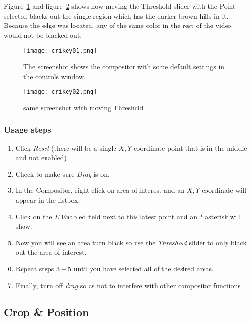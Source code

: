 Figure~\ref{fig:crikey01} and figure~\ref{fig:crikey02} shows how moving the Threshold slider with the Point selected blacks out the single region which has the darker brown hills in it. Because the edge was located, any of the same color in the rest of the video would not be blacked out.

\begin{figure}[htpb]
    \centering
    \texttt{[image: crikey01.png]}
    \caption{The screenshot shows the compositor with some default settings in the controls window.}
    \label{fig:crikey01}
\end{figure}

\begin{figure}[htpb]
    \centering
    \texttt{[image: crikey02.png]}
    \caption{same screenshot with moving Threshold}
    \label{fig:crikey02}
\end{figure}

\subsubsection*{Usage steps}
\label{ssub:usage_steps}

\begin{enumerate}
    \item Click \textit{Reset} (there will be a single $X,Y$ coordinate point that is in the middle and not enabled)
    \item Check to make sure \textit{Drag} is on.
    \item In the Compositor, right click on area of interest and an $X,Y$ coordinate will appear in the listbox.
    \item Click on the \textit{E} Enabled field next to this latest point and an $*$ asterisk will show.
    \item Now you will see an area turn black so use the \textit{Threshold} slider to only black out the area of interest.
    \item Repeat steps $3-5$ until you have selected all of the desired areas.
    \item Finally, turn off \textit{drag} so as not to interfere with other compositor functions
\end{enumerate}

\subsection{Crop \& Position}%
\label{sub:crop_position}

